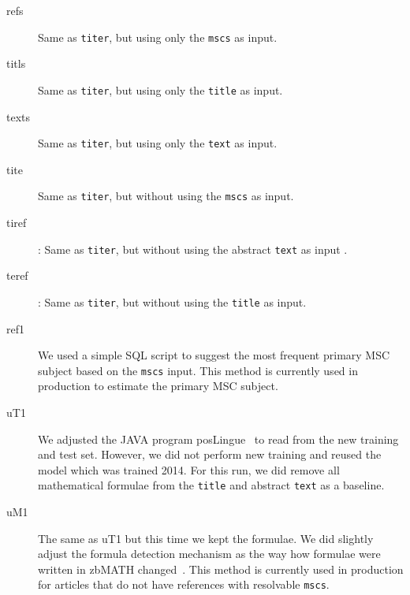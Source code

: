 \begin{description}
  \item[refs] Same as \texttt{titer}, but using only the \texttt{mscs} as input\footnotemark.
  \item[titls] Same as \texttt{titer}, but using only the \texttt{title} as input\footnotemark[\value{footnote}].
  \item[texts] Same as \texttt{titer}, but using only the \texttt{text} as input\footnotemark[\value{footnote}].
  \item[tite] Same as \texttt{titer}, but without using the \texttt{mscs} as input\footnotemark[\value{footnote}].
  \item[tiref]: Same as \texttt{titer}, but without using the abstract \texttt{text} as input \footnotemark[\value{footnote}].
  \item[teref]: Same as \texttt{titer}, but without using the \texttt{title} as input\footnotemark[\value{footnote}].
  \item[ref1] We used a simple SQL script to suggest the most frequent primary MSC subject based on the \texttt{mscs} input. This method is currently used in production to estimate the primary MSC subject.
  \item[uT1] We adjusted the JAVA program posLingue~\cite{SchonebergS14} to read from the new training and test set. However, we did not perform new training and reused the model which was trained 2014. For this run, we did remove all mathematical formulae from the \texttt{title} and abstract \texttt{text} as a baseline.
  \item[uM1] The same as uT1 but this time we kept the formulae. We did slightly adjust the formula detection mechanism as the way how formulae were written in zbMATH changed~\cite{Schubotz2019b}.
  This method is currently used in production for articles that do not have references with resolvable \texttt{mscs}.
\end{description}


